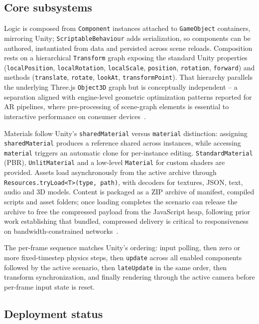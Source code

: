 \subsection{Core subsystems}
Logic is composed from \texttt{Component} instances attached to \texttt{GameObject} containers, mirroring Unity; \texttt{ScriptableBehaviour} adds serialization, so components can be authored, instantiated from data and persisted across scene reloads. Composition rests on a hierarchical \texttt{Transform} graph exposing the standard Unity properties (\texttt{localPosition}, \texttt{localRotation}, \texttt{localScale}, \texttt{position}, \texttt{rotation}, \texttt{forward}) and methods (\texttt{translate}, \texttt{rotate}, \texttt{lookAt}, \texttt{transformPoint}). That hierarchy parallels the underlying Three.js \texttt{Object3D} graph but is conceptually independent -- a separation aligned with engine-level geometric optimization patterns reported for AR pipelines, where pre-processing of scene-graph elements is essential to interactive performance on consumer devices~\cite{Aung2022}.

Materials follow Unity's \texttt{sharedMaterial} versus \texttt{material} distinction: assigning \texttt{sharedMaterial} produces a reference shared across instances, while accessing \texttt{material} triggers an automatic clone for per-instance editing. \texttt{Standard\allowbreak Material} (PBR), \texttt{UnlitMaterial} and a low-level \texttt{Material} for custom shaders are provided. Assets load asynchronously from the active archive through \texttt{Resources.\allowbreak tryLoad<T>(type, path)}, with decoders for textures, JSON, text, audio and 3D models. Content is packaged as a ZIP archive of manifest, compiled scripts and asset folders; once loading completes the scenario can release the archive to free the compressed payload from the JavaScript heap, following prior work establishing that bundled, compressed delivery is critical to responsiveness on bandwidth-constrained networks~\cite{Evans2017}.

The per-frame sequence matches Unity's ordering: input polling, then zero or more fixed-timestep physics steps, then \texttt{update} across all enabled components followed by the active scenario, then \texttt{lateUpdate} in the same order, then transform synchronization, and finally rendering through the active camera before per-frame input state is reset.

\subsection{Deployment status}

